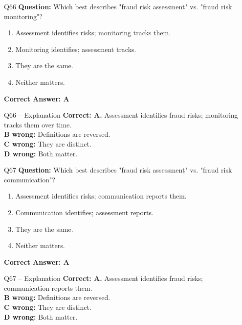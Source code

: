 \documentclass[aspectratio=169,10pt]{beamer}
\begin{document}
	\begin{frame}[t]{Q66}
		\small
		\textbf{Question:} Which best describes "fraud risk assessment" vs. "fraud risk monitoring"?
		\begin{enumerate}[label=\Alph*.,itemsep=1pt,topsep=2pt]
			\item Assessment identifies risks; monitoring tracks them.
			\item Monitoring identifies; assessment tracks.
			\item They are the same.
			\item Neither matters.
		\end{enumerate}
		\vspace{4pt}
		\textbf{Correct Answer: A}
	\end{frame}
	
	\begin{frame}[t]{Q66 -- Explanation}
		\small
		\textbf{Correct: A.} Assessment identifies fraud risks; monitoring tracks them over time. \\[4pt]
		\textbf{B wrong:} Definitions are reversed. \\[2pt]
		\textbf{C wrong:} They are distinct. \\[2pt]
		\textbf{D wrong:} Both matter.
	\end{frame}
	
	\begin{frame}[t]{Q67}
		\small
		\textbf{Question:} Which best describes "fraud risk assessment" vs. "fraud risk communication"?
		\begin{enumerate}[label=\Alph*.,itemsep=1pt,topsep=2pt]
			\item Assessment identifies risks; communication reports them.
			\item Communication identifies; assessment reports.
			\item They are the same.
			\item Neither matters.
		\end{enumerate}
		\vspace{4pt}
		\textbf{Correct Answer: A}
	\end{frame}
	
	\begin{frame}[t]{Q67 -- Explanation}
		\small
		\textbf{Correct: A.} Assessment identifies fraud risks; communication reports them. \\[4pt]
		\textbf{B wrong:} Definitions are reversed. \\[2pt]
		\textbf{C wrong:} They are distinct. \\[2pt]
		\textbf{D wrong:} Both matter.
	\end{frame}
	
\end{document}
